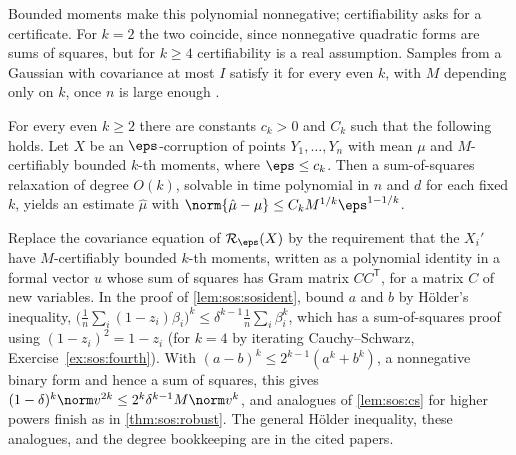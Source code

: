 \begin{refsection}

Bounded moments make this polynomial nonnegative; certifiability asks for a certificate. For $k=2$ the two coincide, since nonnegative quadratic forms are sums of squares, but for $k\ge4$ certifiability is a real assumption. Samples from a Gaussian with covariance at most $I$ satisfy it for every even $k$, with $M$ depending only on $k$, once $n$ is large enough \parencite{Kothari2018,HopkinsLi2018}.

\begin{theorem}\label{thm:sos:moments}
For every even $k\ge2$ there are constants $c_k>0$ and $C_k$ such that the following holds. Let $X$ be an $\eps$-corruption of points $Y_1,\dots,Y_n$ with mean $\mu$ and $M$-certifiably bounded $k$-th moments, where $\eps\le c_k$. Then a sum-of-squares relaxation of degree $O(k)$, solvable in time polynomial in $n$ and $d$ for each fixed $k$, yields an estimate $\hat\mu$ with $\norm{\hat\mu-\mu}\le C_kM^{1/k}\eps^{1-1/k}$.
\end{theorem}

\begin{proofsketch}
Replace the covariance equation of $\sosR_\eps(X)$ by the requirement that the $X_i'$ have $M$-certifiably bounded $k$-th moments, written as a polynomial identity in a formal vector $u$ whose sum of squares has Gram matrix $CC^{\mathsf T}$, for a matrix $C$ of new variables. In the proof of \cref{lem:sos:sosident}, bound $a$ and $b$ by H\"older's inequality, $\bigl(\frac1n\sum_i(1-z_i)\beta_i\bigr)^k\le\delta^{k-1}\frac1n\sum_i\beta_i^k$, which has a sum-of-squares proof using $(1-z_i)^2=1-z_i$ (for $k=4$ by iterating Cauchy--Schwarz, Exercise~\ref{ex:sos:fourth}). With $(a-b)^k\le2^{k-1}(a^k+b^k)$, a nonnegative binary form and hence a sum of squares, this gives $(1-\delta)^k\norm v^{2k}\le2^k\delta^{k-1}M\norm v^k$, and analogues of \cref{lem:sos:cs} for higher powers finish as in \cref{thm:sos:robust}. The general H\"older inequality, these analogues, and the degree bookkeeping are in the cited papers.
\end{proofsketch}


\end{refsection}
